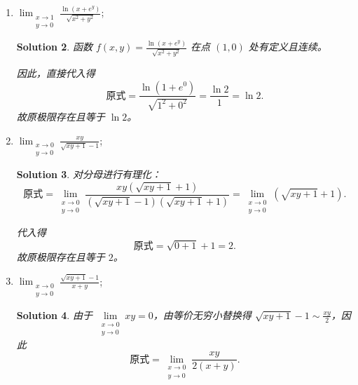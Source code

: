 \documentclass[a4paper,12pt]{article}
\newtheorem*{sol}{Solution}
\begin{document}
\begin{enumerate}
\begin{enumerate}[label=(\arabic*)]
\begin{sol}
                              令 $u = x+y$，则
                              $$
                                    \text{原式} \leq \lim_{u\to\infty} u^2 e^{-u}.
                              $$
                              由于指数函数增长速度快于多项式函数，因此该极限为 $0$。故原极限存在且等于 $0$。
                        \end{sol}
                  \item $\lim_{\substack{x \to 1 \\ y \to 0}} \frac{\ln(x + e^y)}{\sqrt{x^2 + y^2}}$;
                        \begin{sol}
                              函数 $f(x,y) = \frac{\ln(x + e^y)}{\sqrt{x^2 + y^2}}$ 在点 $(1,0)$ 处有定义且连续。
                              
                              因此，直接代入得
                              $$
                                    \text{原式} = \frac{\ln(1 + e^0)}{\sqrt{1^2 + 0^2}} = \frac{\ln 2}{1} = \ln 2.
                              $$
                              故原极限存在且等于 $\ln 2$。
                        \end{sol}
                  \item $\lim_{\substack{x \to 0 \\ y \to 0}} \frac{xy}{\sqrt{xy + 1} - 1}$;
                        \begin{sol}
                              对分母进行有理化：
                              $$
                                    \text{原式} = \lim_{\substack{x \to 0 \\ y \to 0}} \frac{xy(\sqrt{xy + 1} + 1)}{(\sqrt{xy + 1} - 1)(\sqrt{xy + 1} + 1)} = \lim_{\substack{x \to 0 \\ y \to 0}} (\sqrt{xy + 1} + 1).
                              $$
                              
                              代入得
                              $$
                                    \text{原式} = \sqrt{0+1} + 1 = 2.
                              $$
                              故原极限存在且等于 $2$。
                        \end{sol}
                  \item $\lim_{\substack{x \to 0 \\ y \to 0}} \frac{\sqrt{xy + 1} - 1}{x + y}$;
                        \begin{sol}
                              由于 $\lim\limits_{\substack{x \to 0 \\ y \to 0}} xy = 0$，由等价无穷小替换得 $\sqrt{xy + 1} - 1 \sim \frac{xy}{2}$，因此
                              $$
                                    \text{原式} = \lim_{\substack{x \to 0 \\ y \to 0}} \frac{xy}{2(x+y)}.
                              $$
                              

\end{sol}
\end{enumerate}
\end{enumerate}
\end{document}
